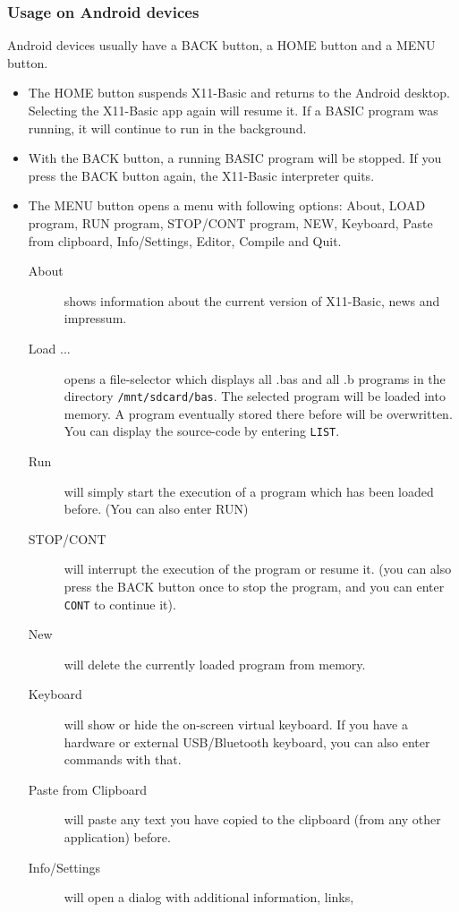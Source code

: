 \subsubsection{Usage on Android devices}

Android devices usually have a BACK button, a HOME button and a MENU button. 
\begin{itemize}
\item The HOME button suspends X11-Basic and returns to the Android desktop. 
      Selecting the X11-Basic app again will resume it. If a BASIC 
      program was running, it will continue to run in the background.
\item With the BACK button, a running BASIC program will be stopped. 
      If you press the BACK button again, the X11-Basic interpreter quits.
\item The MENU button opens a menu with following options: About, LOAD program,
      RUN program, STOP/CONT program, NEW, Keyboard, Paste from clipboard, 
      Info/Settings, Editor, Compile and Quit.
\begin{description}
\item[About] shows information about the current version of X11-Basic, news and 
             impressum.
\item[Load ...] opens a file-selector which displays all .bas and all .b 
                programs in the directory \verb|/mnt/sdcard/bas|. 
		The selected program will be loaded into memory. A program 
		eventually stored there before will be overwritten. You can 
		display the source-code by entering \verb|LIST|.
\item[Run] will simply start the execution of a program which has been 
             loaded before. (You can also enter RUN)
\item[STOP/CONT] will interrupt the execution of the program or resume it. 
                 (you can also press the BACK button once to stop the program, 
		 and you can enter \verb|CONT| to continue it).
\item[New]      will delete the currently loaded program from memory.
\item[Keyboard] will show or hide the on-screen virtual keyboard. If you have 
                a hardware or external USB/Bluetooth keyboard, you can also 
		enter commands with that.
\item[Paste from Clipboard] will paste any text you have copied to the 
                            clipboard (from any other application) before.
\item[Info/Settings] will open a dialog with additional information, links, 

\end{description}
\end{itemize}
